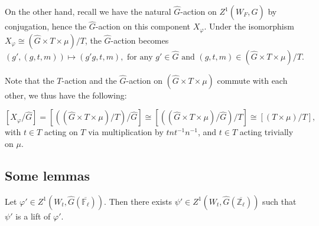 On the other hand, recall we have the natural $\hat{G}$-action on $Z^1(W_F, \hat{G})$ by conjugation, hence the $\hat{G}$-action on this component $X_{\varphi}$. Under the isomorphism $X_{\varphi} \cong (\hat{G} \times T \times \mu)/T$, the $\hat{G}$-action becomes
$$(g', (g, t, m)) \mapsto  (g'g, t, m), \text{ for any } g' \in \hat{G} \text{ and } (g, t, m) \in (\hat{G} \times T \times \mu)/T.$$

Note that the $T$-action and the $\hat{G}$-action on $(\hat{G} \times T \times \mu)$ commute with each other, we thus have the following:

\begin{proposition}\label{T times mu/T}
	$$[X_{\varphi}/\hat{G}]=\left[\left((\hat{G} \times T \times \mu)/T\right)/\hat{G}\right] \cong \left[\left((\hat{G} \times T \times \mu)/\hat{G}\right)/T\right] \cong [(T \times \mu)/T],$$ 
	with $t \in T$ acting on $T$ via multiplication by $tnt^{-1}n^{-1}$, and $t \in T$ acting trivially on $\mu$. 
\end{proposition}

\subsection{Some lemmas}

\begin{lemma}\label{Lem generalizing}
	Let $\varphi' \in Z^1(W_t, \hat{G}(\overline{\mathbb{F}_{\ell}}))$. Then there exists $\psi' \in Z^1(W_t, \hat{G}(\overline{\mathbb{Z}_{\ell}}))$ such that $\psi'$ is a lift of $\varphi'$.
\end{lemma}

